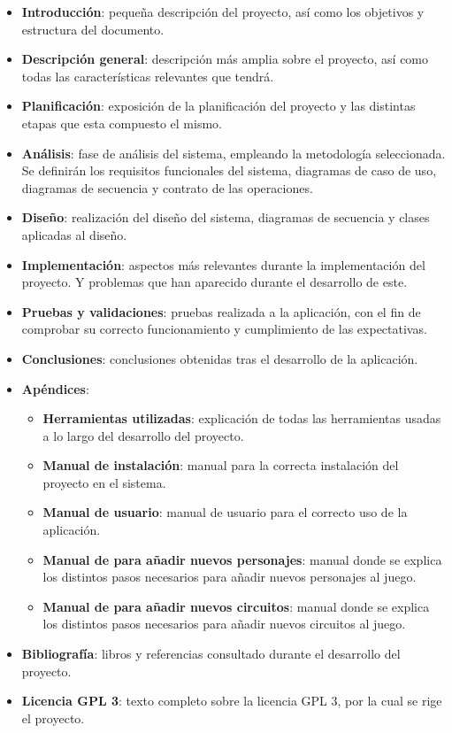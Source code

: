 \begin{itemize}
    \item \textbf{Introducción}: pequeña descripción del proyecto, así como los objetivos y estructura del documento.
    
    \item \textbf{Descripción general}: descripción más amplia sobre el proyecto, así como todas las características relevantes
    que tendrá.
    
    \item \textbf{Planificación}: exposición de la planificación del proyecto y las distintas etapas que esta compuesto el mismo.
    
    \item \textbf{Análisis}: fase de análisis del sistema, empleando la metodología seleccionada. Se definirán los
    requisitos funcionales del sistema, diagramas de caso de uso, diagramas de secuencia y contrato de las operaciones.

    \item \textbf{Diseño}: realización del diseño del sistema, diagramas de secuencia y clases aplicadas al diseño.
    
    \item \textbf{Implementación}: aspectos más relevantes durante la implementación del proyecto. Y problemas que han aparecido 
    durante el desarrollo de este.
    
    \item \textbf{Pruebas y validaciones}: pruebas realizada a la aplicación, con el fin de comprobar su correcto funcionamiento y
    cumplimiento de las expectativas.
    
    \item \textbf{Conclusiones}: conclusiones obtenidas tras el desarrollo de la aplicación.
    
    \item \textbf{Apéndices}: 
    \begin{itemize}
        \item \textbf{Herramientas utilizadas}: explicación de todas las herramientas usadas a lo largo del desarrollo del 
        proyecto.
        \item \textbf{Manual de instalación}: manual para la correcta instalación del proyecto en el sistema.
        \item \textbf{Manual de usuario}: manual de usuario para el correcto uso de la aplicación.
        \item \textbf{Manual de para añadir nuevos personajes}: manual donde se explica los distintos pasos necesarios para añadir
        nuevos personajes al juego.
        \item \textbf{Manual de para añadir nuevos circuitos}: manual donde se explica los distintos pasos necesarios para añadir
        nuevos circuitos al juego.
    \end{itemize}
    
    \item \textbf{Bibliografía}: libros y referencias consultado durante el desarrollo del proyecto.
    
    \item \textbf{Licencia GPL 3}: texto completo sobre la licencia GPL 3, por la cual se rige el proyecto.

\end{itemize}
